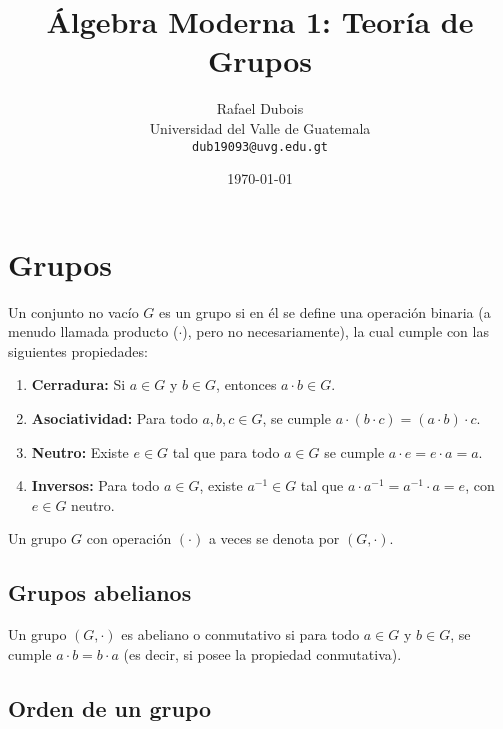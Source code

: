 \documentclass{article}
\title{Álgebra Moderna 1: Teoría de Grupos}
\author{\Large Rafael Dubois\\ Universidad del Valle de Guatemala \\ \texttt{dub19093@uvg.edu.gt}}
\date{\today}
\begin{document}
\maketitle
{}
\thispagestyle{fancy}

\section{Grupos}

Un conjunto no vacío $G$ es un grupo si en él se define una operación binaria (a menudo llamada producto ($\cdot$), pero no necesariamente), la cual cumple con las siguientes propiedades:

\begin{enumerate}
\item \textbf{Cerradura:} Si $a\in G$ y $b\in G$, entonces $a\cdot b\in G$.

\item \textbf{Asociatividad:} Para todo $a,b,c\in G$, se cumple $a\cdot(b\cdot c)=(a\cdot b)\cdot c$.

\item \textbf{Neutro:} Existe $e\in G$ tal que para todo $a\in G$ se cumple $a\cdot e=e\cdot a=a$.

\item \textbf{Inversos:} Para todo $a\in G$, existe $a^{-1}\in G$ tal que $a\cdot a^{-1}=a^{-1}\cdot a=e$, con $e\in G$ neutro.

\end{enumerate}

Un grupo $G$ con operación $(\cdot)$ a veces se denota por $(G,\cdot)$.

\subsection*{\color{violet} Grupos abelianos}

Un grupo $(G,\cdot)$ es abeliano o conmutativo si para todo $a\in G$ y $b\in G$, se cumple $a\cdot b=b\cdot a$ (es decir, si posee la propiedad conmutativa).

\subsection*{\color{violet} Orden de un grupo}
\end{document}
